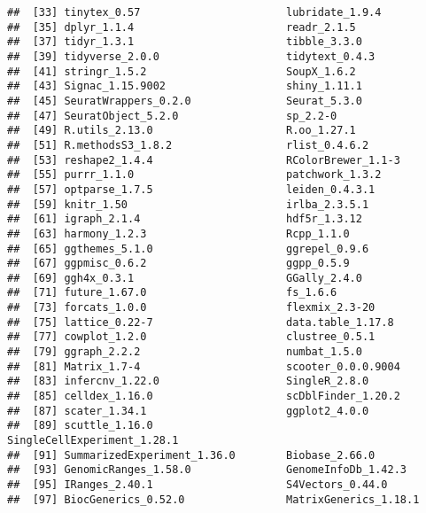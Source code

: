 \documentclass[
  11pt,
  a4paper,
]{article}
\begin{document}
\begin{verbatim}
##  [33] tinytex_0.57                       lubridate_1.9.4                   
##  [35] dplyr_1.1.4                        readr_2.1.5                       
##  [37] tidyr_1.3.1                        tibble_3.3.0                      
##  [39] tidyverse_2.0.0                    tidytext_0.4.3                    
##  [41] stringr_1.5.2                      SoupX_1.6.2                       
##  [43] Signac_1.15.9002                   shiny_1.11.1                      
##  [45] SeuratWrappers_0.2.0               Seurat_5.3.0                      
##  [47] SeuratObject_5.2.0                 sp_2.2-0                          
##  [49] R.utils_2.13.0                     R.oo_1.27.1                       
##  [51] R.methodsS3_1.8.2                  rlist_0.4.6.2                     
##  [53] reshape2_1.4.4                     RColorBrewer_1.1-3                
##  [55] purrr_1.1.0                        patchwork_1.3.2                   
##  [57] optparse_1.7.5                     leiden_0.4.3.1                    
##  [59] knitr_1.50                         irlba_2.3.5.1                     
##  [61] igraph_2.1.4                       hdf5r_1.3.12                      
##  [63] harmony_1.2.3                      Rcpp_1.1.0                        
##  [65] ggthemes_5.1.0                     ggrepel_0.9.6                     
##  [67] ggpmisc_0.6.2                      ggpp_0.5.9                        
##  [69] ggh4x_0.3.1                        GGally_2.4.0                      
##  [71] future_1.67.0                      fs_1.6.6                          
##  [73] forcats_1.0.0                      flexmix_2.3-20                    
##  [75] lattice_0.22-7                     data.table_1.17.8                 
##  [77] cowplot_1.2.0                      clustree_0.5.1                    
##  [79] ggraph_2.2.2                       numbat_1.5.0                      
##  [81] Matrix_1.7-4                       scooter_0.0.0.9004                
##  [83] infercnv_1.22.0                    SingleR_2.8.0                     
##  [85] celldex_1.16.0                     scDblFinder_1.20.2                
##  [87] scater_1.34.1                      ggplot2_4.0.0                     
##  [89] scuttle_1.16.0                     SingleCellExperiment_1.28.1       
##  [91] SummarizedExperiment_1.36.0        Biobase_2.66.0                    
##  [93] GenomicRanges_1.58.0               GenomeInfoDb_1.42.3               
##  [95] IRanges_2.40.1                     S4Vectors_0.44.0                  
##  [97] BiocGenerics_0.52.0                MatrixGenerics_1.18.1             

\end{verbatim}
\end{document}
